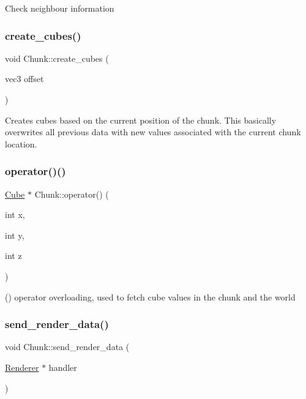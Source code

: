 Check neighbour information \mbox{\label{classChunk_af2b7c93af8b369467a86687e2afde029}} 
\subsubsection{\texorpdfstring{create\+\_\+cubes()}{create\_cubes()}}
{\footnotesize\ttfamily void Chunk\+::create\+\_\+cubes (\begin{DoxyParamCaption}\item[{vec3}]{offset }\end{DoxyParamCaption})}

Creates cubes based on the current position of the chunk. This basically overwrites all previous data with new values associated with the current chunk location. \mbox{\label{classChunk_aa95ae810408dd656b8b750c6baf42e1d}} 
\subsubsection{\texorpdfstring{operator()()}{operator()()}}
{\footnotesize\ttfamily \mbox{\hyperlink{classCube}{Cube}} $\ast$ Chunk\+::operator() (\begin{DoxyParamCaption}\item[{int}]{x,  }\item[{int}]{y,  }\item[{int}]{z }\end{DoxyParamCaption})}

() operator overloading, used to fetch cube values in the chunk and the world \mbox{\label{classChunk_aca780fcf47255bd05242ba1d144d0672}} 
\subsubsection{\texorpdfstring{send\+\_\+render\+\_\+data()}{send\_render\_data()}}
{\footnotesize\ttfamily void Chunk\+::send\+\_\+render\+\_\+data (\begin{DoxyParamCaption}\item[{\mbox{\hyperlink{classRenderer}{Renderer}} $\ast$}]{handler }\end{DoxyParamCaption})\hspace{0.3cm}{\ttfamily [inline]}}


